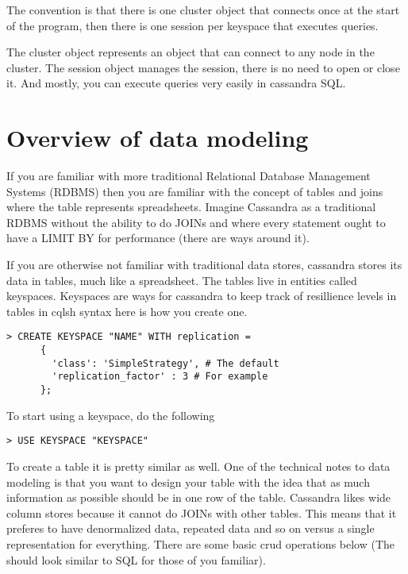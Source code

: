 \documentclass[9pt,twocolumn,twoside]{idsi}
\begin{document}
The convention is that there is one cluster object that connects once at the start of the program, then there is one session per keyspace that executes queries.

The cluster object represents an object that can connect to any node in the cluster. The session object manages the session, there is no need to open or close it. And mostly, you can execute queries very easily in cassandra SQL.

\section{Overview of data modeling}

If you are familiar with more traditional Relational Database Management Systems (RDBMS) then you are familiar with the concept of tables and joins where the table represents spreadsheets. Imagine Cassandra as a traditional RDBMS without the ability to do JOINs and where every statement ought to have a LIMIT BY for performance (there are ways around it).

If you are otherwise not familiar with traditional data stores, cassandra stores its data in tables, much like a spreadsheet. The tables live in entities called keyspaces. Keyspaces are ways for cassandra to keep track of resillience levels in tables in cqlsh syntax here is how you create one.

\begin{lstlisting}[breaklines]
> CREATE KEYSPACE "NAME" WITH replication = 
      {
        'class': 'SimpleStrategy', # The default 
        'replication_factor' : 3 # For example
      };
\end{lstlisting}

To start using a keyspace, do the following

\begin{lstlisting}[breaklines]
> USE KEYSPACE "KEYSPACE"
\end{lstlisting}

To create a table it is pretty similar as well. One of the technical notes to data modeling is that you want to design your table with the idea that as much information as possible should be in one row of the table. Cassandra likes wide column stores because it cannot do JOINs with other tables. This means that it preferes to have denormalized data, repeated data and so on versus a single representation for everything. There are some basic crud operations below (The should look similar to SQL for those of you familiar).
\end{document}
